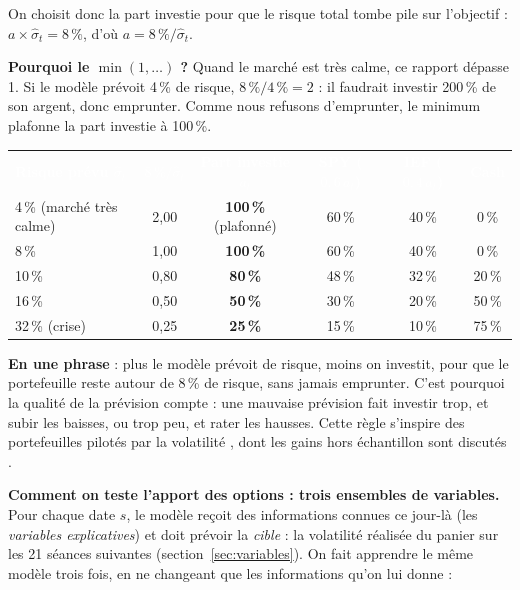 \documentclass[10pt,a4paper]{article}
\newcommand{\entete}[1]{\textcolor{white}{\bfseries #1}}
\begin{document}
On choisit donc la part investie pour que le risque total tombe pile sur l'objectif : $a\times\widehat\sigma_t=8\,\%$, d'où $a=8\,\%/\widehat\sigma_t$.

\textbf{Pourquoi le $\min(1,\dots)$ ?} Quand le marché est très calme, ce rapport dépasse 1. Si le modèle prévoit 4\,\% de risque, $8\,\%/4\,\%=2$ : il faudrait investir 200\,\% de son argent, donc emprunter. Comme nous refusons d'emprunter, le minimum plafonne la part investie à 100\,\%.

{\small
\begin{center}
\begin{tabular}{@{}l c c c c c@{}}
\rowcolor{marine}\entete{Risque prévu $\widehat\sigma_t$} & \entete{$8\,\%/\widehat\sigma_t$} & \entete{Part investie $a_t$} & \entete{SPY ($0{,}6\,a_t$)} & \entete{IEF ($0{,}4\,a_t$)} & \entete{Cash} \\
4\,\% (marché très calme) & 2,00 & \textbf{100\,\%} (plafonné) & 60\,\% & 40\,\% & 0\,\% \\
\rowcolor{gris}8\,\% & 1,00 & \textbf{100\,\%} & 60\,\% & 40\,\% & 0\,\% \\
10\,\% & 0,80 & \textbf{80\,\%} & 48\,\% & 32\,\% & 20\,\% \\
\rowcolor{gris}16\,\% & 0,50 & \textbf{50\,\%} & 30\,\% & 20\,\% & 50\,\% \\
32\,\% (crise) & 0,25 & \textbf{25\,\%} & 15\,\% & 10\,\% & 75\,\% \\
\end{tabular}
\end{center}}

\textbf{En une phrase} : plus le modèle prévoit de risque, moins on investit, pour que le portefeuille reste autour de 8\,\% de risque, sans jamais emprunter. C'est pourquoi la qualité de la prévision compte : une mauvaise prévision fait investir trop, et subir les baisses, ou trop peu, et rater les hausses. Cette règle s'inspire des portefeuilles pilotés par la volatilité \cite{moreira}, dont les gains hors échantillon sont discutés \cite{cederburg}.

\textbf{Comment on teste l'apport des options : trois ensembles de variables.} Pour chaque date $s$, le modèle reçoit des informations connues ce jour-là (les \emph{variables explicatives}) et doit prévoir la \emph{cible} : la volatilité réalisée du panier sur les 21 séances suivantes (section~\ref{sec:variables}). On fait apprendre le même modèle trois fois, en ne changeant que les informations qu'on lui donne :
\end{document}
